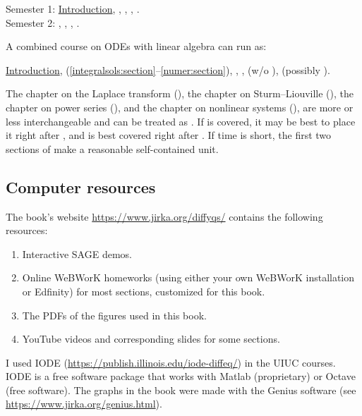 \noindent
Semester 1:
\hyperref[intro:chapter]{Introduction},
,
,
,
.
\\
Semester 2: 
,
,
,
.

\medskip

A combined course on ODEs with linear algebra can run as:

\medskip

\noindent
\hyperref[intro:chapter]{Introduction},
 (\ref{integralsols:section}--\ref{numer:section}),
,
,
 (w/o ), (possibly 
).

\medskip

The chapter on
the Laplace transform (),
the chapter on Sturm--Liouville (),
the chapter on power series (),
and the chapter on nonlinear systems (),
are more or less interchangeable and can be treated as .
If  is covered, it may be best to place it right 
after ,
and  is best covered right after
.
If time is short, the first two sections of
 make a reasonable self-contained unit.

\subsection{Computer resources}

The book's
website \url{https://www.jirka.org/diffyqs/}
contains the following resources:
\begin{enumerate}
\item Interactive SAGE demos.
\item Online WeBWorK homeworks
(using either your own WeBWorK installation or Edfinity)
for most sections, customized for this book.
\item The PDFs of the figures used in this book.
\item YouTube videos and corresponding slides for some sections.
\end{enumerate}

I used IODE
(\url{https://publish.illinois.edu/iode-diffeq/})
in the UIUC courses.
IODE is a free software package that
works with Matlab (proprietary) or Octave (free software).
The graphs in the book were made with
the Genius software
(see \url{https://www.jirka.org/genius.html}).

